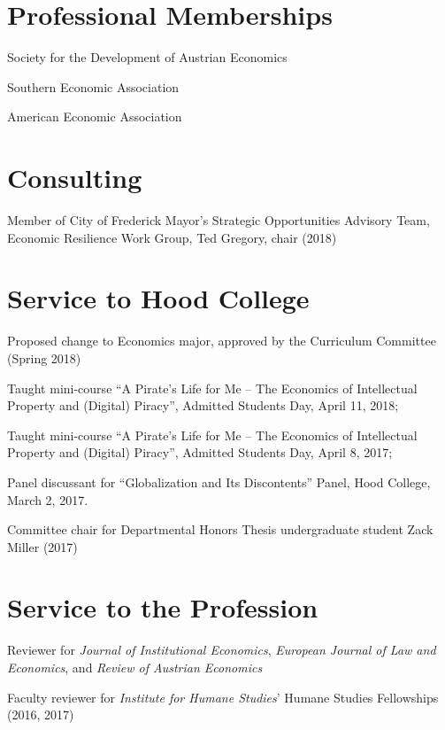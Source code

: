 \documentclass[]{article}
\renewenvironment{itemize}{
  \begin{list}{}{
    \setlength{\leftmargin}{1.5em}
  }
}{
  \end{list}
}
\begin{document}
\section*{Professional Memberships}\begin{itemize}
    \item Society for the Development of Austrian Economics
    \item Southern Economic Association
    \item American Economic Association
\end{itemize}

\section*{Consulting}\begin{itemize}
    \item Member of City of Frederick Mayor's Strategic Opportunities Advisory Team, Economic Resilience Work Group, Ted Gregory, chair (2018)  
\end{itemize}

\section*{Service to Hood College}\begin{itemize}
    \item Proposed change to Economics major, approved by the Curriculum Committee (Spring 2018) 
    \item Taught mini-course ``A Pirate's Life for Me -- The Economics of Intellectual Property and (Digital) Piracy'', Admitted Students Day, April 11, 2018;
    \item Taught mini-course ``A Pirate's Life for Me -- The Economics of Intellectual Property and (Digital) Piracy'', Admitted Students Day, April 8, 2017;
    \item Panel discussant for ``Globalization and Its Discontents'' Panel, Hood College, March 2, 2017. 
    \item Committee chair for Departmental Honors Thesis undergraduate student Zack Miller (2017) 
\end{itemize}

\section*{Service to the Profession}\begin{itemize}
    \item Reviewer for \emph{Journal of Institutional Economics}, \emph{European Journal of Law and Economics}, and \emph{Review of Austrian Economics} 
    \item Faculty reviewer for \emph{Institute for Humane Studies}' Humane Studies Fellowships (2016, 2017) 
\end{itemize}
\end{document}
